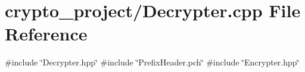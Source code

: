 \section{crypto\+\_\+project/\+Decrypter.cpp File Reference}
\label{_decrypter_8cpp}
{\ttfamily \#include \char`\"{}Decrypter.\+hpp\char`\"{}}\newline
{\ttfamily \#include \char`\"{}Prefix\+Header.\+pch\char`\"{}}\newline
{\ttfamily \#include \char`\"{}Encrypter.\+hpp\char`\"{}}\newline
